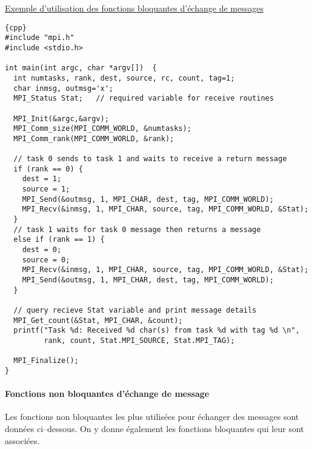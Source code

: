 \documentclass[11pt,a4paper]{article}
\begin{document}
\underline{Exemple d'utilisation des fonctions bloquantes d'échange de messages}

\begin{lstlisting}{cpp}
#include "mpi.h"
#include <stdio.h>

int main(int argc, char *argv[])  {
  int numtasks, rank, dest, source, rc, count, tag=1;  
  char inmsg, outmsg='x';
  MPI_Status Stat;   // required variable for receive routines

  MPI_Init(&argc,&argv);
  MPI_Comm_size(MPI_COMM_WORLD, &numtasks);
  MPI_Comm_rank(MPI_COMM_WORLD, &rank);

  // task 0 sends to task 1 and waits to receive a return message
  if (rank == 0) {
    dest = 1;
    source = 1;
    MPI_Send(&outmsg, 1, MPI_CHAR, dest, tag, MPI_COMM_WORLD);
    MPI_Recv(&inmsg, 1, MPI_CHAR, source, tag, MPI_COMM_WORLD, &Stat);
  } 
  // task 1 waits for task 0 message then returns a message
  else if (rank == 1) {
    dest = 0;
    source = 0;
    MPI_Recv(&inmsg, 1, MPI_CHAR, source, tag, MPI_COMM_WORLD, &Stat);
    MPI_Send(&outmsg, 1, MPI_CHAR, dest, tag, MPI_COMM_WORLD);
  }

  // query recieve Stat variable and print message details
  MPI_Get_count(&Stat, MPI_CHAR, &count);
  printf("Task %d: Received %d char(s) from task %d with tag %d \n",
         rank, count, Stat.MPI_SOURCE, Stat.MPI_TAG);

  MPI_Finalize();
}
\end{lstlisting}

\paragraph{Fonctions non bloquantes d'échange de message}

Les fonctions non bloquantes les plus utilisées pour échanger des messages
sont données ci--dessous. On y donne également les fonctions bloquantes
qui leur sont associées.
\end{document}
